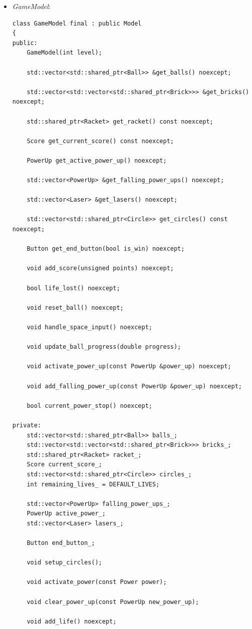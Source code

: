\documentclass[utf8]{article}
\begin{document}
\begin{itemize}
    \item \emph{GameModel}:
    \begin{verbatim}
class GameModel final : public Model
{
public:
    GameModel(int level);

    std::vector<std::shared_ptr<Ball>> &get_balls() noexcept;

    std::vector<std::vector<std::shared_ptr<Brick>>> &get_bricks() noexcept;

    std::shared_ptr<Racket> get_racket() const noexcept;

    Score get_current_score() const noexcept;

    PowerUp get_active_power_up() noexcept;

    std::vector<PowerUp> &get_falling_power_ups() noexcept;

    std::vector<Laser> &get_lasers() noexcept;

    std::vector<std::shared_ptr<Circle>> get_circles() const noexcept;

    Button get_end_button(bool is_win) noexcept;

    void add_score(unsigned points) noexcept;

    bool life_lost() noexcept;

    void reset_ball() noexcept;

    void handle_space_input() noexcept;

    void update_ball_progress(double progress);

    void activate_power_up(const PowerUp &power_up) noexcept;

    void add_falling_power_up(const PowerUp &power_up) noexcept;

    bool current_power_stop() noexcept;

private:
    std::vector<std::shared_ptr<Ball>> balls_;
    std::vector<std::vector<std::shared_ptr<Brick>>> bricks_;
    std::shared_ptr<Racket> racket_;
    Score current_score_;
    std::vector<std::shared_ptr<Circle>> circles_;
    int remaining_lives_ = DEFAULT_LIVES;

    std::vector<PowerUp> falling_power_ups_;
    PowerUp active_power_;
    std::vector<Laser> lasers_;

    Button end_button_;

    void setup_circles();

    void activate_power(const Power power);

    void clear_power_up(const PowerUp new_power_up);

    void add_life() noexcept;


\end{verbatim}
\end{itemize}
\end{document}
